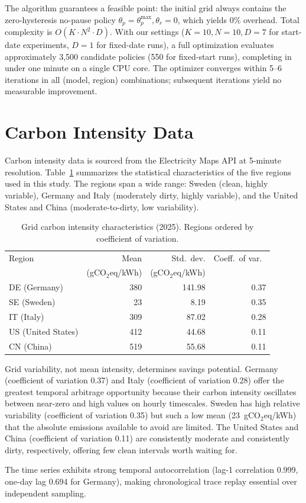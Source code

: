 The algorithm guarantees a feasible point: the initial grid always contains the
zero-hysteresis no-pause policy $\theta_p = \theta_p^{\max}, \theta_r = 0$,
which yields 0\% overhead.  Total complexity is $O(K \cdot N^2 \cdot D)$.
With our settings ($K=10, N=10, D=7$ for start-date experiments, $D=1$ for
fixed-date runs), a full optimization evaluates approximately 3,500 candidate
policies (550 for fixed-start runs), completing in under one minute on a
single CPU core.  The optimizer converges within 5--6 iterations in all
(model, region) combinations; subsequent iterations yield no measurable
improvement.

\section{Carbon Intensity Data}
\label{sec:carbon-data}

Carbon intensity data is sourced from the Electricity Maps API at 5-minute
resolution.  Table~\ref{tab:grid} summarizes the statistical characteristics of
the five regions used in this study.  The regions span a wide range: Sweden
(clean, highly variable), Germany and Italy (moderately dirty, highly
variable), and the United States and China (moderate-to-dirty, low
variability).

\begin{table}
    \centering
    \caption{Grid carbon intensity characteristics (2025).  Regions ordered by
    coefficient of variation.}
    \label{tab:grid}
    \small
    \begin{tabular}{lrrr}
      \toprule
      Region & Mean & Std.\ dev. & Coeff.\ of var.\ \\
      & (gCO$_2$eq/kWh) & (gCO$_2$eq/kWh) & \\
      \midrule
      DE (Germany) & 380 & 141.98 & 0.37 \\
      SE (Sweden)  &  23 &   8.19 & 0.35 \\
      IT (Italy)   & 309 &  87.02 & 0.28 \\
      US (United States) & 412 & 44.68 & 0.11 \\
      CN (China)   & 519 &  55.68 & 0.11 \\
      \bottomrule
    \end{tabular}
\end{table}

Grid variability, not mean intensity, determines savings potential.  Germany
(coefficient of variation 0.37) and Italy (coefficient of variation 0.28) offer the greatest temporal arbitrage
opportunity because their carbon intensity oscillates between near-zero and
high values on hourly timescales.  Sweden has high relative variability (coefficient of variation
0.35) but such a low mean (23~gCO$_2$eq/kWh) that the absolute emissions
available to avoid are limited.  The United States and China (coefficient of variation 0.11) are
consistently moderate and consistently dirty, respectively, offering few clean
intervals worth waiting for.

The time series exhibits strong temporal autocorrelation (lag-1 correlation
0.999, one-day lag 0.694 for Germany), making chronological trace replay
essential over independent sampling.
